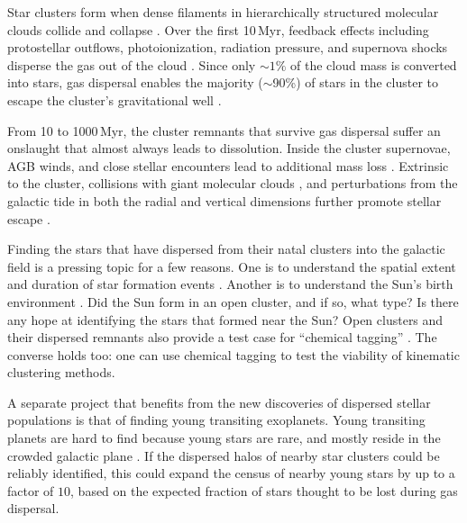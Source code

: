 \documentclass[12pt,twocolumn,tighten]{aastex63}
\begin{document}
Star clusters form when dense filaments in hierarchically structured
molecular clouds collide and collapse \citep{shu_star_1987}.  Over the
first 10\,Myr, feedback effects including protostellar outflows,
photoionization, radiation pressure, and supernova shocks disperse the
gas out of the cloud \citep{krumholz_star_2019}.  Since only $\sim
1\%$ of the cloud mass is converted into stars, gas dispersal enables
the majority ($\sim$90\%) of stars in the cluster to escape the
cluster's gravitational well \citep{lada_embedded_2003}.

From 10 to 1000\,Myr, the cluster remnants that survive gas dispersal
suffer an onslaught that almost always leads to dissolution.  Inside
the cluster supernovae, AGB winds, and close stellar encounters lead
to additional mass loss \citep{lamers_mass_loss_2010}.  Extrinsic to
the cluster, collisions with giant molecular clouds
\citep{spitzer_disruption_1958}, and perturbations from the galactic
tide in both the radial and vertical dimensions further promote
stellar escape \citep[{\it
e.g.},][]{fukushige_timescale_2000,bergond_gravitational_2001}.

Finding the stars that have dispersed from their natal clusters into
the galactic field is a pressing topic for a few reasons.  One is to
understand the spatial extent and duration of star formation events
\citep[{\it e.g.},][]{wright_kinematics_2018}.  Another is to
understand the Sun's birth environment \citep{adams_birth_2010}.  Did
the Sun form in an open cluster, and if so, what type? Is there any
hope at identifying the stars that formed near the Sun?  Open clusters
and their dispersed remnants also provide a test case for ``chemical
tagging'' \citep[{\it
e.g.},][]{freeman_new_2002,hogg_chemical_2016,ness_dopplergangers_2018}.
The converse holds too: one can use chemical tagging to test the
viability of kinematic clustering methods.

A separate project that benefits from the new discoveries of dispersed
stellar populations is that of finding young transiting exoplanets.
Young transiting planets are hard to find because young stars are
rare, and mostly reside in the crowded galactic plane \citep[see {\it
e.g.},][]{Kharchenko_et_al_2013,piskunov_global_2018}.  If the
dispersed halos of nearby star clusters could be reliably identified,
this could expand the census of nearby young stars by up to a factor
of $10$, based on the expected fraction of stars thought to be lost
during gas dispersal.
\end{document}
